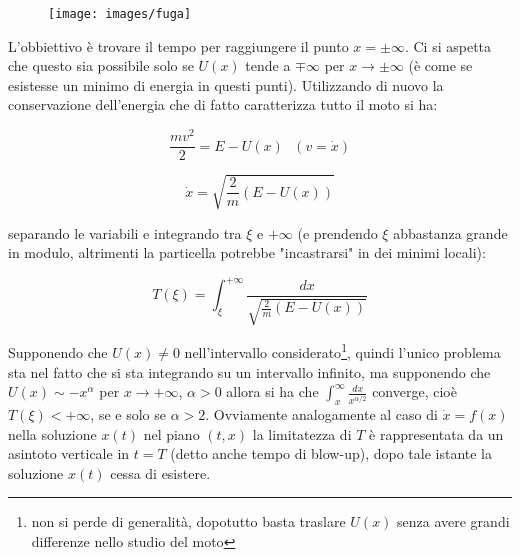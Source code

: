 \documentclass[Main.tex]{subfiles}
\begin{document}
\begin{appendic}

\begin{figure}[H]
    \centering
    \texttt{[image: images/fuga]}
\end{figure}


L'obbiettivo è trovare il tempo per raggiungere il punto $x=\pm \infty$. Ci si aspetta che questo sia possibile solo se $U(x)$ tende a $\mp \infty$ per $x\rightarrow \pm \infty$ (è come se esistesse un minimo di energia in questi punti).
Utilizzando di nuovo la conservazione dell'energia che di fatto caratterizza tutto il moto si ha:
	
\begin{equation}
  \frac{mv^2}{2}=E-U(x) \ \ \ (v = \dot x)
\end{equation}

	
\begin{equation}
  \dot x = \sqrt{\frac{2}{m}(E-U(x))}
\end{equation}

	separando le variabili e integrando tra $\xi$ e $+\infty$ (e prendendo $\xi$ abbastanza grande in modulo, altrimenti la particella potrebbe "incastrarsi" in dei minimi locali):
	
\begin{equation}
  	T(\xi)= \int _\xi ^{+\infty} \frac{dx}{\sqrt{\frac{2}{m}(E-U(x))}}
\end{equation}

	Supponendo che $U(x) \neq 0$ nell'intervallo considerato\footnote{non si perde di generalità, dopotutto basta traslare $U(x)$ senza avere grandi differenze nello studio del moto}, quindi l'unico problema sta nel fatto che si sta integrando su un intervallo infinito, ma supponendo che $U(x) \sim -x^\alpha$ per $x \longrightarrow +\infty$, $\alpha >0$ allora si ha che $\int_x ^\infty \frac{dx}{x^{\alpha / 2}}$ converge, cioè $T(\xi) < + \infty$, se e solo se $\alpha >2$. Ovviamente analogamente al caso di $\dot x=f(x)$ nella soluzione $x(t)$ nel piano $(t,x)$ la limitatezza di $T$ è rappresentata da un asintoto verticale in $t=T$ (detto anche tempo di blow-up), dopo tale istante la soluzione $x(t)$ cessa di esistere.
\end{appendic} 
\end{document}
